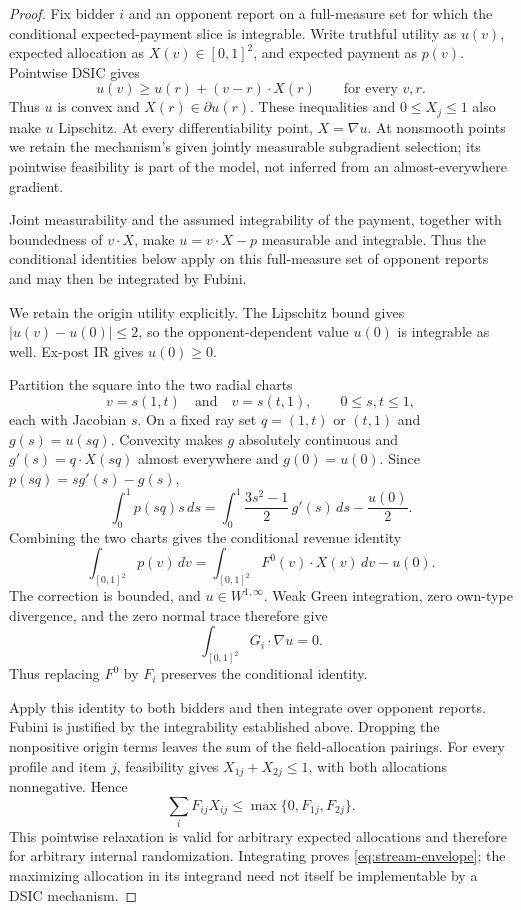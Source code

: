 \documentclass[11pt]{article}
\begin{document}
\begin{proof}
Fix bidder \(i\) and an opponent report on a full-measure set for which the
conditional expected-payment slice is integrable.  Write truthful utility as
\(u(v)\), expected allocation as \(X(v)\in[0,1]^2\), and expected payment as
\(p(v)\).  Pointwise DSIC gives
\[
u(v)\geq u(r)+(v-r)\cdot X(r)\qquad\text{for every }v,r.
\]
Thus \(u\) is convex and \(X(r)\in\partial u(r)\).  These inequalities and
\(0\leq X_j\leq1\) also make \(u\) Lipschitz.  At every differentiability
point, \(X=\nabla u\).  At nonsmooth points we retain the mechanism's given
jointly measurable subgradient selection; its pointwise feasibility is part
of the model, not inferred from an almost-everywhere gradient.

Joint measurability and the assumed integrability of the payment, together
with boundedness of \(v\cdot X\), make \(u=v\cdot X-p\) measurable and
integrable.  Thus the conditional identities below apply on this full-measure
set of opponent reports and may then be integrated by Fubini.

We retain the origin utility explicitly.  The Lipschitz bound gives
\(|u(v)-u(0)|\leq2\), so the opponent-dependent value \(u(0)\) is integrable
as well.  Ex-post IR gives \(u(0)\geq0\).

Partition the square into the two radial charts
\[
v=s(1,t)\quad\text{and}\quad v=s(t,1),
\qquad 0\leq s,t\leq1,
\]
each with Jacobian \(s\).  On a fixed ray set \(q=(1,t)\) or \((t,1)\) and
\(g(s)=u(sq)\).  Convexity makes \(g\) absolutely continuous and
\(g'(s)=q\cdot X(sq)\) almost everywhere and \(g(0)=u(0)\).  Since
\(p(sq)=s g'(s)-g(s)\),
\[
\int_0^1p(sq)s\,ds
=\int_0^1\frac{3s^2-1}{2}\,g'(s)\,ds-\frac{u(0)}2.
\]
Combining the two charts gives the conditional revenue identity
\[
\int_{[0,1]^2}p(v)\,dv
=\int_{[0,1]^2}F^0(v)\cdot X(v)\,dv-u(0).
\]
The correction is bounded, and \(u\in W^{1,\infty}\).  Weak Green integration,
zero own-type divergence, and the zero normal trace therefore give
\[
\int_{[0,1]^2}G_i\cdot\nabla u=0.
\]
Thus replacing \(F^0\) by \(F_i\) preserves the conditional identity.

Apply this identity to both bidders and then integrate over opponent reports.
Fubini is justified by the integrability established above.  Dropping the
nonpositive origin terms leaves the sum of the field-allocation pairings.
For every profile and item \(j\), feasibility gives
\(X_{1j}+X_{2j}\leq1\), with both allocations nonnegative.  Hence
\[
\sum_i F_{ij}X_{ij}
\leq
\max\{0,F_{1j},F_{2j}\}.
\]
This pointwise relaxation is valid for arbitrary expected allocations and
therefore for arbitrary internal randomization.  Integrating proves
\eqref{eq:stream-envelope}; the maximizing allocation in its integrand need
not itself be implementable by a DSIC mechanism.
\end{proof}
\end{document}
